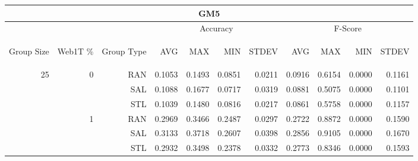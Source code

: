 \begin{center}
\begin{table}[htbp] 
 \begin{center}
\begin{tabular}{ | r | r | r | r | r | r | r | r | r | r | r |}
\hline
\multicolumn{11}{|c|}{GM5}\\
\hline
 & & & \multicolumn{4}{|c|}{Accuracy} & \multicolumn{4}{|c|}{F-Score}\\ \cline{4-11}
\begin{sideways}Group Size\end{sideways} & \begin{sideways}Web1T \%\end{sideways} & \begin{sideways}Group Type\end{sideways} & \begin{sideways}AVG\end{sideways} & \begin{sideways}MAX\end{sideways} & \begin{sideways}MIN\end{sideways} & \begin{sideways}STDEV\end{sideways} & \begin{sideways}AVG\end{sideways} & \begin{sideways}MAX\end{sideways} & \begin{sideways}MIN\end{sideways} & \begin{sideways}STDEV\end{sideways}\\
\hline
\multirow{12}{*}{25}
 & \multirow{3}{*}{0} & RAN & 0.1053 & 0.1493 & 0.0851 & 0.0211 & 0.0916 & 0.6154 & 0.0000 & 0.1161\\ \cline{3-11}
 &   & SAL & 0.1088 & 0.1677 & 0.0717 & 0.0319 & 0.0881 & 0.5075 & 0.0000 & 0.1101\\ \cline{3-11}
 &   & STL & 0.1039 & 0.1480 & 0.0816 & 0.0217 & 0.0861 & 0.5758 & 0.0000 & 0.1157\\ \cline{2-11}
 & \multirow{3}{*}{1} & RAN & 0.2969 & 0.3466 & 0.2487 & 0.0297 & 0.2722 & 0.8872 & 0.0000 & 0.1590\\ \cline{3-11}
 &   & SAL & 0.3133 & 0.3718 & 0.2607 & 0.0398 & 0.2856 & 0.9105 & 0.0000 & 0.1670\\ \cline{3-11}
 &   & STL & 0.2932 & 0.3498 & 0.2378 & 0.0332 & 0.2773 & 0.8346 & 0.0000 & 0.1593\\ \cline{2-11}

\end{tabular}
\end{center}
\end{table}
\end{center}
